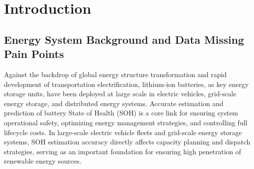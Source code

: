 \documentclass[10pt,a4paper]{article}
\begin{document}
\begin{abstract}
Experimental results indicate that under missing rate $\geq 0.4$ conditions, introducing the MIM version significantly reduces SOH prediction error across all four neural network models (improvement rates of 26\%--57\%). Specifically, at MR=0.5, 1D-CNN-MIM reduces MAE from 0.034 to 0.015 (improvement rate of 55.3\%), while LSTM-MIM reduces it from 0.022 to 0.016 (improvement rate of 29.0\%). Under extreme conditions at MR=0.9, baseline models generally exhibit MAE exceeding 0.029, whereas MIM versions can still maintain values below 0.029, demonstrating significant missing data robustness. Further comparative analysis reveals that performance differences among different imputation methods are relatively limited, while whether to use missing indicators has a more critical impact on prediction performance. This study provides a concise yet effective technical solution for data missing problems in practical Battery Management Systems (BMS), holding important theoretical and practical value for improving the applicability of data-driven SOH prediction methods in real-world engineering environments.

\textbf{Keywords:} lithium-ion battery; State of Health (SOH) prediction; missing data; Missing Indicator Matrix (MIM); XJTU dataset; deep learning
\end{abstract}

\section{Introduction}\label{sec:intro}

\subsection{Energy System Background and Data Missing Pain Points}

Against the backdrop of global energy structure transformation and rapid development of transportation electrification, lithium-ion batteries, as key energy storage units, have been deployed at large scale in electric vehicles, grid-scale energy storage, and distributed energy systems. Accurate estimation and prediction of battery State of Health (SOH) is a core link for ensuring system operational safety, optimizing energy management strategies, and controlling full lifecycle costs. In large-scale electric vehicle fleets and grid-scale energy storage systems, SOH estimation accuracy directly affects capacity planning and dispatch strategies, serving as an important foundation for ensuring high penetration of renewable energy sources.
\end{document}
